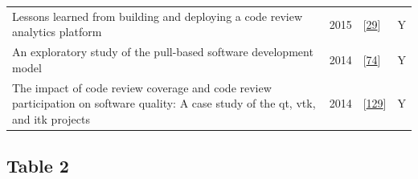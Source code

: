 \documentclass[]{book}
\begin{document}
\begin{longtable}[]{@{}llll@{}}
\begin{minipage}[t]{0.63\columnwidth}
Lessons learned from building and deploying a code review analytics
platform\strut
\end{minipage} & \begin{minipage}[t]{0.03\columnwidth}\raggedright\strut
2015\strut
\end{minipage} & \begin{minipage}[t]{0.14\columnwidth}\raggedright\strut
{[}\protect\hyperlink{ref-bird2015lessons}{29}{]}\strut
\end{minipage} & \begin{minipage}[t]{0.09\columnwidth}\raggedright\strut
Y\strut
\end{minipage}\tabularnewline
\begin{minipage}[t]{0.63\columnwidth}\raggedright\strut
An exploratory study of the pull-based software development model\strut
\end{minipage} & \begin{minipage}[t]{0.03\columnwidth}\raggedright\strut
2014\strut
\end{minipage} & \begin{minipage}[t]{0.14\columnwidth}\raggedright\strut
{[}\protect\hyperlink{ref-gousios2014exploratory}{74}{]}\strut
\end{minipage} & \begin{minipage}[t]{0.09\columnwidth}\raggedright\strut
Y\strut
\end{minipage}\tabularnewline
\begin{minipage}[t]{0.63\columnwidth}\raggedright\strut
The impact of code review coverage and code review participation on
software quality: A case study of the qt, vtk, and itk projects\strut
\end{minipage} & \begin{minipage}[t]{0.03\columnwidth}\raggedright\strut
2014\strut
\end{minipage} & \begin{minipage}[t]{0.14\columnwidth}\raggedright\strut
{[}\protect\hyperlink{ref-mcintosh2014impact}{129}{]}\strut
\end{minipage} & \begin{minipage}[t]{0.09\columnwidth}\raggedright\strut
Y\strut
\end{minipage}\tabularnewline
\bottomrule
\end{longtable}

\subsection{Table 2}\label{table-2}
\end{document}
